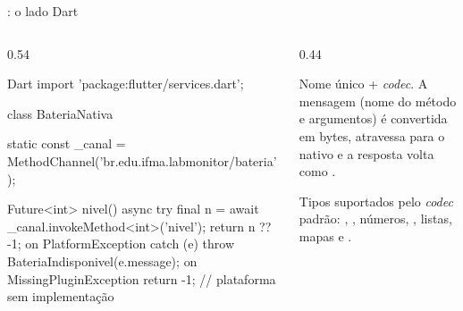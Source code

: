 \documentclass[aspectratio=169,10pt]{beamer}
\begin{document}
\begin{frame}[fragile]{: o lado Dart}
  \begin{columns}[T]
    \begin{column}{0.54\textwidth}
\begin{codigo}[title=lib/data/services/bateria\_nativa.dart]{Dart}
import 'package:flutter/services.dart';

class BateriaNativa {
  static const _canal =
      MethodChannel('br.edu.ifma.labmonitor/bateria');

  Future<int> nivel() async {
    try {
      final n = await _canal.invokeMethod<int>('nivel');
      return n ?? -1;
    } on PlatformException catch (e) {
      throw BateriaIndisponivel(e.message);
    } on MissingPluginException {
      return -1;            // plataforma sem implementação
    }
  }
}
\end{codigo}
    \end{column}
    \begin{column}{0.44\textwidth}
      \centering
      \begin{conceito}[Canal]
        Nome único + \emph{codec}. A mensagem (nome do método e argumentos) é convertida em bytes, atravessa para o nativo e a resposta volta como .
      \end{conceito}
      \begin{dica}
        Tipos suportados pelo \emph{codec} padrão: , , números, , listas, mapas e .
      \end{dica}
    \end{column}
  \end{columns}
\end{frame}
\end{document}
